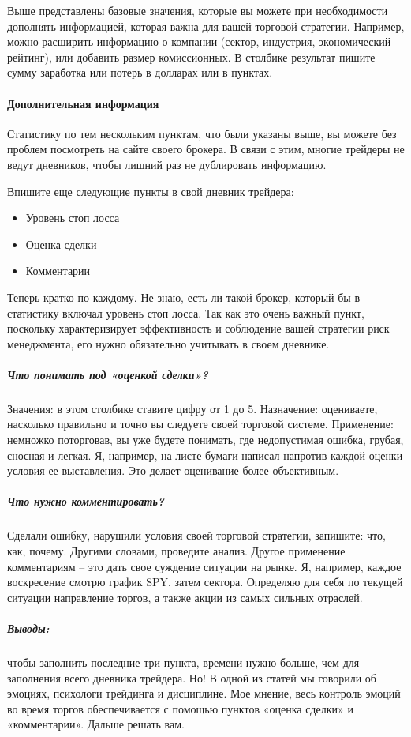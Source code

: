 \documentclass{book}
\begin{document}
Выше представлены базовые значения, которые вы можете при
необходимости дополнять информацией, которая важна для вашей торговой
стратегии. Например, можно расширить информацию о компании (сектор,
индустрия, экономический рейтинг), или добавить размер комиссионных. В
столбике результат пишите сумму заработка или потерь в долларах или в
пунктах.

\paragraph{Дополнительная информация}

Статистику по тем нескольким пунктам, что были указаны выше, вы можете без проблем посмотреть на сайте своего брокера. В связи с этим, многие трейдеры не ведут дневников, чтобы лишний раз не дублировать информацию.

Впишите еще следующие пункты в свой дневник трейдера:
\begin{itemize}
\item     Уровень стоп лосса
\item     Оценка сделки
\item     Комментарии
\end{itemize}

Теперь кратко по каждому. Не знаю, есть ли такой брокер, который бы в статистику включал уровень стоп лосса. Так как это очень важный пункт, поскольку характеризирует эффективность и соблюдение вашей стратегии риск менеджмента, его нужно обязательно учитывать в своем дневнике.

\subparagraph{Что понимать под «оценкой сделки»?} Значения: в этом столбике ставите цифру от 1 до 5. Назначение: оцениваете, насколько правильно и точно вы следуете своей торговой системе. Применение: немножко поторговав, вы уже будете понимать, где недопустимая ошибка, грубая, сносная и легкая. Я, например, на листе бумаги написал напротив каждой оценки условия ее выставления. Это делает оценивание более объективным.

\subparagraph{Что нужно комментировать? }Сделали ошибку, нарушили условия своей торговой стратегии, запишите: что, как, почему. Другими словами, проведите анализ. Другое применение комментариям – это дать свое суждение ситуации на рынке. Я, например, каждое воскресение смотрю график SPY, затем сектора. Определяю для себя по текущей ситуации направление торгов, а также акции из самых сильных отраслей.

\subparagraph{Выводы:} чтобы заполнить последние три пункта, времени нужно больше, чем для заполнения всего дневника трейдера. Но! В одной из статей мы говорили об эмоциях, психологи трейдинга и дисциплине. Мое мнение, весь контроль эмоций во время торгов обеспечивается с помощью пунктов «оценка сделки» и «комментарии». Дальше решать вам.
\end{document}
